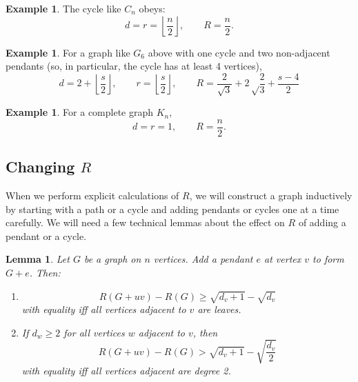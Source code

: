 \documentclass{amsart}
\newtheorem{lemma}[thm]{Lemma}
\theoremstyle{definition}
\newtheorem{ex}[thm]{Example}
\begin{document}
\begin{ex}\label{ex:cycle}
The cycle like $C_n$ obeys: 
\[d = r = \left\lfloor \frac{n}{2} \right\rfloor, \qquad R = \frac{n}{2}.\]
\end{ex}

\begin{ex}\label{ex:lollipop}
For a graph like $G_6$ above with one cycle and two non-adjacent pendants (so, in particular, the cycle has at least 4 vertices),
\[d=2+\left\lfloor\frac{s}{2}\right\rfloor, \qquad r=\left\lfloor\frac{s}{2}\right\rfloor, \qquad R = \frac{2}{\sqrt{3}} + 2\sqrt\frac{2}{3} + \frac{s-4}{2}\]
\end{ex}

\begin{ex}\label{ex:complete}
For a complete graph $K_n$,
\[d = r = 1, \qquad R = \frac{n}{2}.\]
\end{ex}

\subsection{Changing $R$}

When we perform explicit calculations of $R$, we will construct a graph inductively by starting with a path or a cycle and adding pendants or cycles one at a time carefully. We will need a few technical lemmas about the effect on $R$ of adding a pendant or a cycle.


\begin{lemma}\label{lemma:leaf}
Let $G$ be a graph on $n$ vertices. Add a pendant $e$ at vertex $v$ to form $G+e$. Then:
\begin{enumerate}
\item\cite[Lemma~1]{bollobas1998extremal}
\[R(G+uv)-R(G) \geq \sqrt{d_v+1}-\sqrt{d_v}\]
with equality iff all vertices adjacent to $v$ are leaves. 
\item If $d_w \geq 2$ for all vertices $w$ adjacent to $v$, then
\[R(G+uv)-R(G) > \sqrt{d_v+1} - \sqrt{\frac{d_v}{2}}\]
with equality iff all vertices adjacent are degree 2.
\end{enumerate}
\end{lemma}
\end{document}
